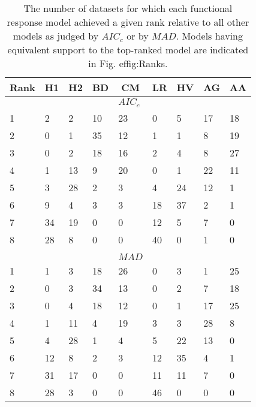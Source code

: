 \begin{table}[!tbp]
\caption{The number of datasets for which each functional response model achieved a given rank relative to all other models as judged by $AIC_c$ or by $MAD$.  Models having equivalent support to the top-ranked model are indicated in Fig. 
ef{fig:Ranks}.\label{table:AICc_and_MAD_rankings}} 
\begin{center}
\begin{tabular}{lllllllll}
\hline\hline
\multicolumn{1}{l}{Rank}&\multicolumn{1}{c}{H1}&\multicolumn{1}{c}{H2}&\multicolumn{1}{c}{BD}&\multicolumn{1}{c}{CM}&\multicolumn{1}{c}{LR}&\multicolumn{1}{c}{HV}&\multicolumn{1}{c}{AG}&\multicolumn{1}{c}{AA}\tabularnewline
\hline
&&&&$AIC_c$&&&&\tabularnewline
1&2&2&10&23&0&5&17&18\tabularnewline
2&0&1&35&12&1&1&8&19\tabularnewline
3&0&2&18&16&2&4&8&27\tabularnewline
4&1&13&9&20&0&1&22&11\tabularnewline
5&3&28&2&3&4&24&12&1\tabularnewline
6&9&4&3&3&18&37&2&1\tabularnewline
7&34&19&0&0&12&5&7&0\tabularnewline
8&28&8&0&0&40&0&1&0\tabularnewline
&&&&&&&&\tabularnewline
&&&&$MAD$&&&&\tabularnewline
1&1&3&18&26&0&3&1&25\tabularnewline
2&0&3&34&13&0&2&7&18\tabularnewline
3&0&4&18&12&0&1&17&25\tabularnewline
4&1&11&4&19&3&3&28&8\tabularnewline
5&4&28&1&4&5&22&13&0\tabularnewline
6&12&8&2&3&12&35&4&1\tabularnewline
7&31&17&0&0&11&11&7&0\tabularnewline
8&28&3&0&0&46&0&0&0\tabularnewline
\hline
\end{tabular}\end{center}
\end{table}
